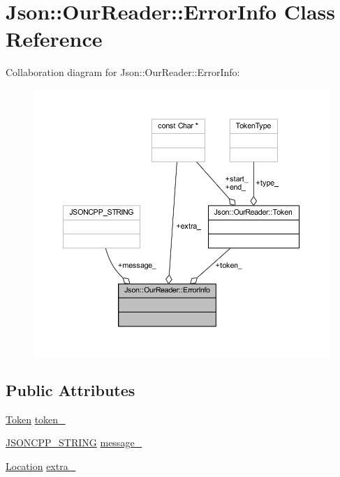 \hypertarget{class_json_1_1_our_reader_1_1_error_info}{}\section{Json\+:\+:Our\+Reader\+:\+:Error\+Info Class Reference}
\label{class_json_1_1_our_reader_1_1_error_info}


Collaboration diagram for Json\+:\+:Our\+Reader\+:\+:Error\+Info\+:\nopagebreak
\begin{figure}[H]
\begin{center}
\leavevmode
\includegraphics[width=350pt]{class_json_1_1_our_reader_1_1_error_info__coll__graph}
\end{center}
\end{figure}
\subsection*{Public Attributes}
\begin{DoxyCompactItemize}
\item 
\hyperlink{class_json_1_1_our_reader_1_1_token}{Token} \hyperlink{class_json_1_1_our_reader_1_1_error_info_ad05204ecabe5e7201a842935b874ae9a}{token\+\_\+}
\item 
\hyperlink{json_8h_a1e723f95759de062585bc4a8fd3fa4be}{J\+S\+O\+N\+C\+P\+P\+\_\+\+S\+T\+R\+I\+NG} \hyperlink{class_json_1_1_our_reader_1_1_error_info_af14b6bf58ee1cb3388c18ee336ee2394}{message\+\_\+}
\item 
\hyperlink{class_json_1_1_our_reader_a1bdc7bbc52ba87cae6b19746f2ee0189}{Location} \hyperlink{class_json_1_1_our_reader_1_1_error_info_a77ba2d32a471c7b9bc14621b76a5bdab}{extra\+\_\+}
\end{DoxyCompactItemize}


